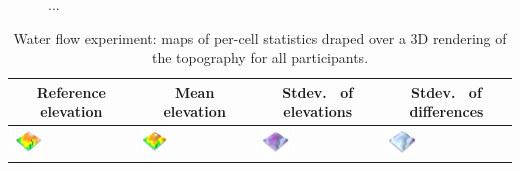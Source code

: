 \documentclass[Afour,sageh,times]{sagej}
\newcommand{\ra}[1]{\renewcommand{\arraystretch}{#1}}
\begin{document}
\begin{figure}
\begin{center}
\end{center}
\caption{...}
\label{F1}
\end{figure}


\begin{table}[h]
\small\sf\centering
%
\caption{Water flow experiment: maps of per-cell statistics draped over a 3D rendering of the topography  for all participants.}
\ra{1.3}
\begin{tabular}{m{} m{} m{} m{}}
\toprule
\multicolumn{1}{c}{Reference elevation} & \multicolumn{1}{c}{Mean elevation} & \multicolumn{1}{c}{Stdev.~ of elevations} & \multicolumn{1}{c}{Stdev.~ of differences}\\
\midrule
\includegraphics[width=0.24\textwidth]{images/render_3d/participants/dem_5.png} &
\includegraphics[width=0.24\textwidth]{images/render_3d/participants/mean_dem_5.png} &
\includegraphics[width=0.24\textwidth]{images/render_3d/participants/stdev_dem_5.png} &
\includegraphics[width=0.24\textwidth]{images/render_3d/participants/stdev_regression_difference_series_5.png}\\

\end{tabular}
\end{table}
\end{document}
